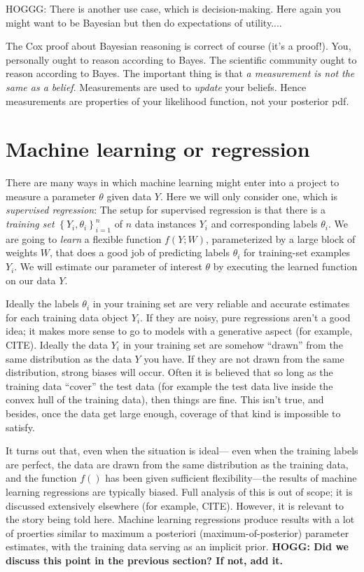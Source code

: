 \documentclass{article}
\newcommand{\setof}[1]{\left\{{#1}\right\}}
\begin{document}
HOGGG: There is another use case, which is decision-making.
Here again you might want to be Bayesian but then do expectations of utility....

The Cox proof about Bayesian reasoning is correct of course (it's a proof!).
You, personally ought to reason according to Bayes.
The scientific community ought to reason according to Bayes.
The important thing is that \emph{a measurement is not the same as a belief}.
Measurements are used to \emph{update} your beliefs.
Hence measurements are properties of your likelihood function, not your posterior pdf.

\section{Machine learning or regression}\label{sec:ml}
There are many ways in which machine learning might enter into a project to measure a parameter $\theta$ given data $Y$.
Here we will only consider one, which is \emph{supervised regression}:
The setup for supervised regression is that there is a \emph{training set} $\setof{Y_i, \theta_i}_{i=1}^n$ of $n$ data instances $Y_i$ and corresponding labels $\theta_i$.
We are going to \emph{learn} a flexible function $f(Y;W)$, parameterized by a large block of weights $W$, that does a good job of predicting labels $\theta_i$ for training-set examples $Y_i$.
We will estimate our parameter of interest $\theta$ by executing the learned function on our data $Y$.

Ideally the labels $\theta_i$ in your training set are very reliable and accurate estimates for each training data object $Y_i$.
If they are noisy, pure regressions aren't a good idea; it makes more sense to go to models with a generative aspect (for example, CITE).
Ideally the data $Y_i$ in your training set are somehow ``drawn'' from the same distribution as the data $Y$ you have.
If they are not drawn from the same distribution, strong biases will occur.
Often it is believed that so long as the training data ``cover'' the test data (for example the test data live inside the convex hull of the training data), then things are fine.
This isn't true, and besides, once the data get large enough, coverage of that kind is impossible to satisfy.

It turns out that, even when the situation is ideal---%
even when the training labels are perfect, the data are drawn from the same distribution as the training data, and the function $f()$ has been given sufficient flexibility---the results of machine learning regressions are typically biased.
Full analysis of this is out of scope; it is discussed extensively elsewhere (for example, CITE).
However, it is relevant to the story being told here.
Machine learning regressions produce results with a lot of proerties similar to maximum a posteriori (maximum-of-posterior) parameter estimates, with the training data serving as an implicit prior.
\textbf{HOGG: Did we discuss this point in the previous section? If not, add it.}
\end{document}
